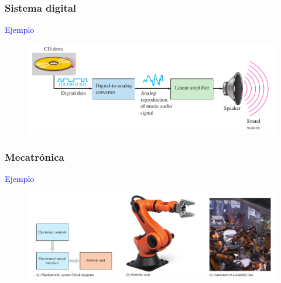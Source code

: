\documentclass[10.5pt,scale=1.0,t,aspectratio=169,hyperref={pdfpagelabels=false}]{beamer}
\begin{document}
\begin{frame}
	\frametitle{Sistema digital}
	\textcolor{blue}{\large Ejemplo} \\
\begin{figure}
	\centering
	\includegraphics[width=14cm]{SistemaCD}
\end{figure}	
\end{frame}

\begin{frame}
	\frametitle{Mecatrónica}
	\textcolor{blue}{\large Ejemplo} \\
\begin{figure}
	\centering
	\includegraphics[width=14cm]{Mecatronica}
\end{figure}	
\end{frame}
\end{document}
